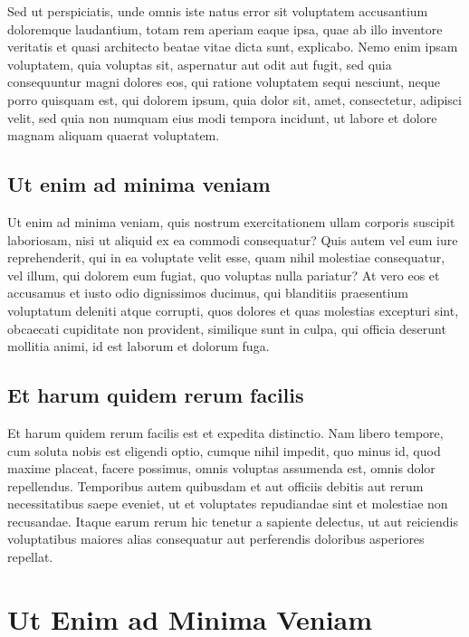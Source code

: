 Sed ut perspiciatis, unde omnis iste natus error sit voluptatem accusantium doloremque laudantium, totam rem aperiam eaque ipsa, quae ab illo inventore veritatis et quasi architecto beatae vitae dicta sunt, explicabo. Nemo enim ipsam voluptatem, quia voluptas sit, aspernatur aut odit aut fugit, sed quia consequuntur magni dolores eos, qui ratione voluptatem sequi nesciunt, neque porro quisquam est, qui dolorem ipsum, quia dolor sit, amet, consectetur, adipisci velit, sed quia non numquam eius modi tempora incidunt, ut labore et dolore magnam aliquam quaerat voluptatem.

\subsection{Ut enim ad minima veniam}

Ut enim ad minima veniam, quis nostrum exercitationem ullam corporis suscipit laboriosam, nisi ut aliquid ex ea commodi consequatur? Quis autem vel eum iure reprehenderit, qui in ea voluptate velit esse, quam nihil molestiae consequatur, vel illum, qui dolorem eum fugiat, quo voluptas nulla pariatur? At vero eos et accusamus et iusto odio dignissimos ducimus, qui blanditiis praesentium voluptatum deleniti atque corrupti, quos dolores et quas molestias excepturi sint, obcaecati cupiditate non provident, similique sunt in culpa, qui officia deserunt mollitia animi, id est laborum et dolorum fuga.

\subsection{Et harum quidem rerum facilis}

Et harum quidem rerum facilis est et expedita distinctio. Nam libero tempore, cum soluta nobis est eligendi optio, cumque nihil impedit, quo minus id, quod maxime placeat, facere possimus, omnis voluptas assumenda est, omnis dolor repellendus. Temporibus autem quibusdam et aut officiis debitis aut rerum necessitatibus saepe eveniet, ut et voluptates repudiandae sint et molestiae non recusandae. Itaque earum rerum hic tenetur a sapiente delectus, ut aut reiciendis voluptatibus maiores alias consequatur aut perferendis doloribus asperiores repellat.

\section{Ut Enim ad Minima Veniam}

